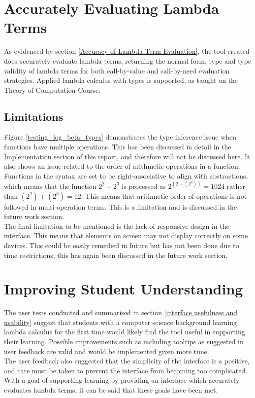 \documentclass[a4paper,11pt]{report}
\begin{document}
\section{Accurately Evaluating Lambda Terms}
As evidenced by section \ref{Accuracy of Lambda Term Evaluation}, the tool created does accurately evaluate lambda terms, returning the normal form, type and type validity of lambda terms for both call-by-value and call-by-need evaluation strategies. Applied lambda calculus with types is supported, as taught on the Theory of Computation Course.

\subsection{Limitations}
Figure \ref{testing_log_beta_types} demonstrates the type inference issue when functions have multiple operations. This has been discussed in detail in the Implementation section of this report, and therefore will not be discussed here. It also shows an issue related to the order of arithmetic operations in a function. Functions in the syntax are set to be right-associative to align with abstractions, which means that the function $2^2+2^3$ is processed as $2^(2+(2^3)) = 1024$ rather than $(2^2)+(2^3) = 12$. This means that arithmetic order of operations is not followed in multi-operation terms. This is a limitation and is discussed in the future work section.\\

The final limitation to be mentioned is the lack of responsive design in the interface. This means that elements on screen may not display correctly on some devices. This could be easily remedied in future but has not been done due to time restrictions, this has again been discussed in the future work section.

\section{Improving Student Understanding}
The user tests conducted and summarised in section \ref{interface usefulness and usability} suggest that students with a computer science background learning lambda calculus for the first time would likely find the tool useful in supporting their learning. Possible improvements such as including tooltips as suggested in user feedback are valid and would be implemented given more time.\\

The user feedback also suggested that the simplicity of the interface is a positive, and care must be taken to prevent the interface from becoming too complicated. With a goal of supporting learning by providing an interface which accurately evaluates lambda terms, it can be said that these goals have been met.
\end{document}
